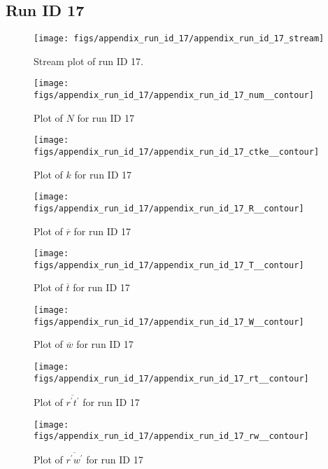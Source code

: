 \subsection{Run ID 17}
\begin{figure}[H]
\centering
\texttt{[image: figs/appendix\_run\_id\_17/appendix\_run\_id\_17\_stream]}
\caption{Stream plot of run ID 17.}
\label{fig:appendix_run_id_17_stream}
\end{figure}


\begin{figure}[H]
\centering
\texttt{[image: figs/appendix\_run\_id\_17/appendix\_run\_id\_17\_num\_\_contour]}
\caption{Plot of $N$ for run ID 17}
\label{fig:appendix_run_id_17_num__contour}
\end{figure}


\begin{figure}[H]
\centering
\texttt{[image: figs/appendix\_run\_id\_17/appendix\_run\_id\_17\_ctke\_\_contour]}
\caption{Plot of $k$ for run ID 17}
\label{fig:appendix_run_id_17_ctke__contour}
\end{figure}


\begin{figure}[H]
\centering
\texttt{[image: figs/appendix\_run\_id\_17/appendix\_run\_id\_17\_R\_\_contour]}
\caption{Plot of $\overline{r}$ for run ID 17}
\label{fig:appendix_run_id_17_R__contour}
\end{figure}


\begin{figure}[H]
\centering
\texttt{[image: figs/appendix\_run\_id\_17/appendix\_run\_id\_17\_T\_\_contour]}
\caption{Plot of $\overline{t}$ for run ID 17}
\label{fig:appendix_run_id_17_T__contour}
\end{figure}


\begin{figure}[H]
\centering
\texttt{[image: figs/appendix\_run\_id\_17/appendix\_run\_id\_17\_W\_\_contour]}
\caption{Plot of $\overline{w}$ for run ID 17}
\label{fig:appendix_run_id_17_W__contour}
\end{figure}


\begin{figure}[H]
\centering
\texttt{[image: figs/appendix\_run\_id\_17/appendix\_run\_id\_17\_rt\_\_contour]}
\caption{Plot of $\overline{r^\prime t^\prime}$ for run ID 17}
\label{fig:appendix_run_id_17_rt__contour}
\end{figure}


\begin{figure}[H]
\centering
\texttt{[image: figs/appendix\_run\_id\_17/appendix\_run\_id\_17\_rw\_\_contour]}
\caption{Plot of $\overline{r^\prime w^\prime}$ for run ID 17}
\label{fig:appendix_run_id_17_rw__contour}
\end{figure}


